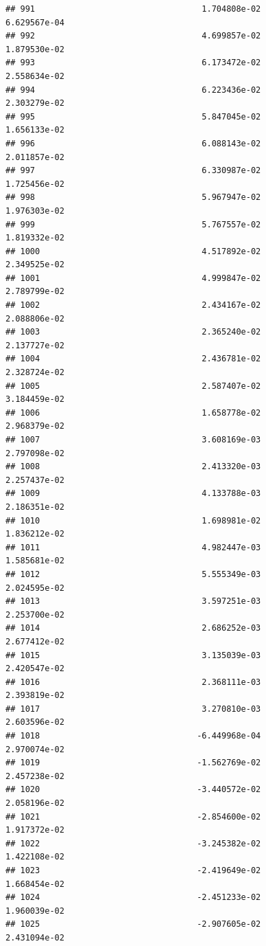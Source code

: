 \documentclass[
]{article}
\begin{document}
\begin{verbatim}
## 991                                  1.704808e-02           6.629567e-04
## 992                                  4.699857e-02           1.879530e-02
## 993                                  6.173472e-02           2.558634e-02
## 994                                  6.223436e-02           2.303279e-02
## 995                                  5.847045e-02           1.656133e-02
## 996                                  6.088143e-02           2.011857e-02
## 997                                  6.330987e-02           1.725456e-02
## 998                                  5.967947e-02           1.976303e-02
## 999                                  5.767557e-02           1.819332e-02
## 1000                                 4.517892e-02           2.349525e-02
## 1001                                 4.999847e-02           2.789799e-02
## 1002                                 2.434167e-02           2.088806e-02
## 1003                                 2.365240e-02           2.137727e-02
## 1004                                 2.436781e-02           2.328724e-02
## 1005                                 2.587407e-02           3.184459e-02
## 1006                                 1.658778e-02           2.968379e-02
## 1007                                 3.608169e-03           2.797098e-02
## 1008                                 2.413320e-03           2.257437e-02
## 1009                                 4.133788e-03           2.186351e-02
## 1010                                 1.698981e-02           1.836212e-02
## 1011                                 4.982447e-03           1.585681e-02
## 1012                                 5.555349e-03           2.024595e-02
## 1013                                 3.597251e-03           2.253700e-02
## 1014                                 2.686252e-03           2.677412e-02
## 1015                                 3.135039e-03           2.420547e-02
## 1016                                 2.368111e-03           2.393819e-02
## 1017                                 3.270810e-03           2.603596e-02
## 1018                                -6.449968e-04           2.970074e-02
## 1019                                -1.562769e-02           2.457238e-02
## 1020                                -3.440572e-02           2.058196e-02
## 1021                                -2.854600e-02           1.917372e-02
## 1022                                -3.245382e-02           1.422108e-02
## 1023                                -2.419649e-02           1.668454e-02
## 1024                                -2.451233e-02           1.960039e-02
## 1025                                -2.907605e-02           2.431094e-02

\end{verbatim}
\end{document}
